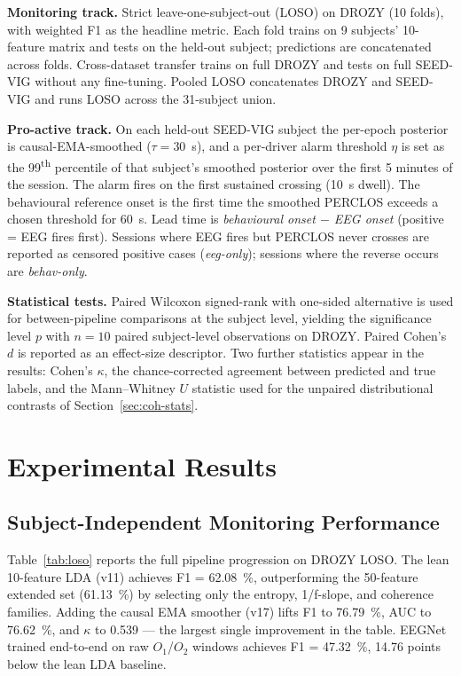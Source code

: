 \documentclass[journal]{IEEEtran}
\DeclareRobustCommand{\add}[1]{#1}                         %
\DeclareRobustCommand{\del}[1]{}                           %
\DeclareRobustCommand{\add}[1]{\hl{#1}}
\DeclareRobustCommand{\del}[1]{{\color{delred}\sout{#1}}\,}
\DeclareRobustCommand{\del}[1]{}                         %
\DeclareRobustCommand{\chg}[2]{\del{#1}\add{#2}}
\begin{document}
\textbf{Monitoring track.} Strict leave-one-subject-out (LOSO) on DROZY (10 folds), with weighted F1 as the headline metric. Each fold trains on 9 subjects' 10-feature matrix and tests on the held-out subject; predictions are concatenated across folds. Cross-dataset transfer trains on full DROZY and tests on full SEED-VIG without any fine-tuning. Pooled LOSO concatenates DROZY and SEED-VIG and runs LOSO across the 31-subject union.

\textbf{Pro-active track.} On each held-out SEED-VIG subject the per-epoch posterior is causal-EMA-smoothed (\(\tau = 30\)~s), and a per-driver alarm threshold \add{\mbox{\(\eta\)}} is set as the 99\textsuperscript{th} percentile of that subject's smoothed posterior over the first 5 minutes of the session. The alarm fires on the first sustained crossing (10~s dwell). The behavioural reference onset is the first time the smoothed PERCLOS exceeds a chosen threshold for 60~s. Lead time is \emph{behavioural onset $-$ EEG onset} (positive = EEG fires first). Sessions where EEG fires but PERCLOS never crosses are reported as censored positive cases (\emph{eeg-only}); sessions where the reverse occurs are \emph{behav-only}.

\textbf{Statistical tests.} Paired Wilcoxon signed-rank with one-sided alternative is used for between-pipeline comparisons at the subject level, \add{yielding the significance level \mbox{\(p\)} with \mbox{\(n = 10\)} paired subject-level observations on DROZY.} Paired Cohen's \(d\) is reported as an effect-size descriptor. \add{Two further statistics appear in the results: Cohen's \mbox{\(\kappa\)}, the chance-corrected agreement between predicted and true labels, and the Mann--Whitney \mbox{\(U\)} statistic used for the unpaired distributional contrasts of Section~\mbox{\ref{sec:coh-stats}}.}

\section{\chg{Results}{Experimental Results}}
\label{sec:results}
\subsection{\chg{Monitoring Track}{Subject-Independent Monitoring Performance}}
\label{sec:monitoring}
Table~\ref{tab:loso} reports the full pipeline progression on DROZY LOSO. The lean 10-feature LDA (v11) achieves F1 = 62.08~\%, outperforming the 50-feature extended set (61.13~\%) by selecting only the entropy, 1/f-slope, and coherence families. Adding the causal EMA smoother (v17) lifts F1 to 76.79~\%, AUC to 76.62~\%, and \(\kappa\) to 0.539 --- the largest single improvement in the table. EEGNet trained end-to-end on raw \(O_1\)/\(O_2\) windows achieves F1 = 47.32~\%, 14.76 points below the lean LDA baseline.
\end{document}
